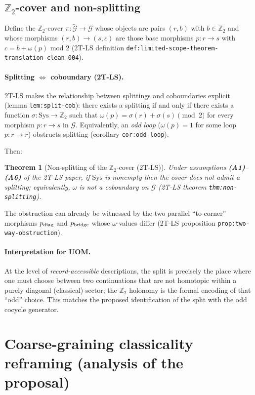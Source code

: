 \documentclass[11pt]{article}
\theoremstyle{definition}
\theoremstyle{plain}
\newtheorem{theorem}[definition]{Theorem}
\theoremstyle{remark}
\newcommand{\Ztwo}{\mathbb Z_2}
\newcommand{\Sys}{\mathrm{Sys}}
\begin{document}
\subsection{$\Ztwo$-cover and non-splitting}
\label{subsec:nonsplitting}

Define the $\Ztwo$-cover $\pi:\widetilde{\mathcal G}\to\mathcal G$ whose objects are pairs $(r,b)$ with $b\in\Ztwo$
and whose morphisms $(r,b)\to(s,c)$ are those base morphisms $p:r\to s$ with $c=b+\omega(p)$ mod $2$
(2T-LS definition \texttt{def:limited-scope-theorem-translation-clean-004}).

\paragraph{Splitting $\Leftrightarrow$ coboundary (2T-LS).}
2T-LS makes the relationship between splittings and coboundaries explicit (lemma \texttt{lem:split-cob}):
there exists a splitting if and only if there exists a function $\sigma:\Sys\to\Ztwo$ such that
$\omega(p)=\sigma(r)+\sigma(s)\pmod 2$ for every morphism $p:r\to s$ in $\mathcal G$.
Equivalently, an \emph{odd loop} ($\omega(p)=1$ for some loop $p:r\to r$) obstructs splitting (corollary
\texttt{cor:odd-loop}).

Then:
\begin{theorem}[Non-splitting of the $\Ztwo$-cover (2T-LS)]
Under assumptions \textbf{(A1)}--\textbf{(A6)} of the 2T-LS paper, if $\Sys$ is nonempty then the cover does not admit a
splitting; equivalently, $\omega$ is not a coboundary on $\mathcal G$ (2T-LS theorem \texttt{thm:non-splitting}).
\end{theorem}
The obstruction can already be witnessed by the two parallel ``to-corner'' morphisms $p_{\rm diag}$ and $p_{\rm bridge}$
whose $\omega$-values differ (2T-LS proposition \texttt{prop:two-way-obstruction}).

\paragraph{Interpretation for UOM.}
At the level of \emph{record-accessible} descriptions, the split is precisely the place where one must choose between two
continuations that are not homotopic within a purely diagonal (classical) sector; the $\Ztwo$ holonomy is the formal
encoding of that ``odd'' choice. This matches the proposed identification of the split with the odd cocycle generator.

\section{Coarse-graining classicality reframing (analysis of the proposal)}
\label{sec:coarse-graining}
\end{document}
